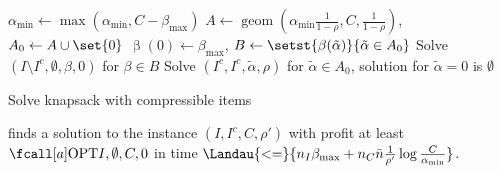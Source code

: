 \begin{algorithm}
  $\alpha_{\min} \leftarrow \max(\alpha_{\min}, C - \beta_{\max})$ \label{line:alpha_min}\;
  $A \leftarrow \mathop{\mathrm{geom}}(\alpha_{\min} \frac{1}{1-\rho}, C, \frac{1}{1-\rho})$,
    $A_0 \leftarrow A \cup \set{0}$ \;
  $\mathop{\beta}(0) \leftarrow \beta_{\max}$,
    $B \leftarrow \setst{\mathop{\beta}(\tilde{\alpha})}{\tilde{\alpha} \in A_0}$ \;
  Solve $(I \setminus I^c, \emptyset, \beta, 0)$ for $\beta \in B$ \label{line:solve-incompressible}\;
  Solve $(I^c, I^c, \tilde{\alpha}, \rho)$ for $\tilde{\alpha} \in A_0$,
    solution for $\tilde{\alpha} = 0$ is $\emptyset$ \label{line:solve-compressible}\;
  
  \caption{Solve knapsack with compressible items}
  \label{alg:knapsack-compressible}
\end{algorithm}

\begin{theorem}
  \label{thm:knapsack-compressible}
   finds a solution to the instance $(I, I^c, C, \rho')$
  with profit at least $\KPCOPT{I, \emptyset, C, 0}$
  in time $\Landau{<=}{n_I \beta_{\max} + n_C \bar{n} \frac{1}{\rho'} \log \frac{C}{\alpha_{\min}}}$.
\end{theorem}

